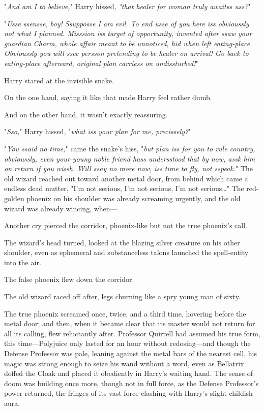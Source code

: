 "\emph{And am I to believe,}" Harry hissed, \emph{"that healer for woman truly 
awaitss uss?}"

"\emph{Usse ssensse, boy! Ssupposse I am evil. To end usse of you here iss 
obvioussly not what I planned. Misssion iss target of opportunity, invented 
after ssaw your guardian Charm, whole affair meant to be unnoticed, hid when 
left eating-place. Obvioussly you will ssee persson pretending to be healer on 
arrival! Go back to eating-place afterward, original plan carriess on 
undissturbed!}"

Harry stared at the invisible snake.

On the one hand, saying it like that made Harry feel rather dumb.

And on the other hand, it wasn't exactly reassuring.

"\emph{Sso,}" Harry hissed, "\emph{what iss your plan for me, precissely?}"

"\emph{You ssaid no time,}" came the snake's hiss, "\emph{but plan iss for you 
to rule country, obvioussly, even your young noble friend hass undersstood that 
by now, assk him on return if you wissh. Will ssay no more now, iss time to 
fly, not sspeak.}"
\sbreak
The old wizard reached out toward another metal door, from behind which came a 
endless dead mutter, "I'm not serious, I'm not serious, I'm not 
serious{\ldots}" The red-golden phoenix on his shoulder was already screaming 
urgently, and the old wizard was already wincing, when---

Another cry pierced the corridor, phoenix-like but not the true phoenix's call.

The wizard's head turned, looked at the blazing silver creature on his other 
shoulder, even as ephemeral and substanceless talons launched the spell-entity 
into the air.

The false phoenix flew down the corridor.

The old wizard raced off after, legs churning like a spry young man of sixty.

The true phoenix screamed once, twice, and a third time, hovering before the 
metal door; and then, when it became clear that its master would not return for 
all its calling, flew reluctantly after.
\sbreak
Professor Quirrell had assumed his true form, this time---Polyjuice only lasted 
for an hour without redosing---and though the Defense Professor was pale, 
leaning against the metal bars of the nearest cell, his magic was strong enough 
to seize his wand without a word, even as Bellatrix doffed the Cloak and placed 
it obediently in Harry's waiting hand. The sense of doom was building once 
more, though not in full force, as the Defense Professor's power returned, the 
fringes of its vast force clashing with Harry's slight childish aura.

